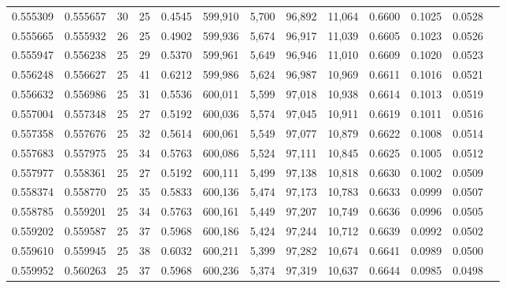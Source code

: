 \begin{tabular}{rrrrrrrrrrrrr}
0.555309 & 0.555657 &    30 &  25 &                                     0.4545 & 599,910 &   5,700 &  96,892 &  11,064 & 0.6600 & 0.1025 & 0.0528 \\
0.555665 & 0.555932 &    26 &  25 &                                     0.4902 & 599,936 &   5,674 &  96,917 &  11,039 & 0.6605 & 0.1023 & 0.0526 \\
0.555947 & 0.556238 &    25 &  29 &                                     0.5370 & 599,961 &   5,649 &  96,946 &  11,010 & 0.6609 & 0.1020 & 0.0523 \\
0.556248 & 0.556627 &    25 &  41 &                                     0.6212 & 599,986 &   5,624 &  96,987 &  10,969 & 0.6611 & 0.1016 & 0.0521 \\
0.556632 & 0.556986 &    25 &  31 &                                     0.5536 & 600,011 &   5,599 &  97,018 &  10,938 & 0.6614 & 0.1013 & 0.0519 \\
0.557004 & 0.557348 &    25 &  27 &                                     0.5192 & 600,036 &   5,574 &  97,045 &  10,911 & 0.6619 & 0.1011 & 0.0516 \\
0.557358 & 0.557676 &    25 &  32 &                                     0.5614 & 600,061 &   5,549 &  97,077 &  10,879 & 0.6622 & 0.1008 & 0.0514 \\
0.557683 & 0.557975 &    25 &  34 &                                     0.5763 & 600,086 &   5,524 &  97,111 &  10,845 & 0.6625 & 0.1005 & 0.0512 \\
0.557977 & 0.558361 &    25 &  27 &                                     0.5192 & 600,111 &   5,499 &  97,138 &  10,818 & 0.6630 & 0.1002 & 0.0509 \\
0.558374 & 0.558770 &    25 &  35 &                                     0.5833 & 600,136 &   5,474 &  97,173 &  10,783 & 0.6633 & 0.0999 & 0.0507 \\
0.558785 & 0.559201 &    25 &  34 &                                     0.5763 & 600,161 &   5,449 &  97,207 &  10,749 & 0.6636 & 0.0996 & 0.0505 \\
0.559202 & 0.559587 &    25 &  37 &                                     0.5968 & 600,186 &   5,424 &  97,244 &  10,712 & 0.6639 & 0.0992 & 0.0502 \\
0.559610 & 0.559945 &    25 &  38 &                                     0.6032 & 600,211 &   5,399 &  97,282 &  10,674 & 0.6641 & 0.0989 & 0.0500 \\
0.559952 & 0.560263 &    25 &  37 &                                     0.5968 & 600,236 &   5,374 &  97,319 &  10,637 & 0.6644 & 0.0985 & 0.0498 \\

\end{tabular}
